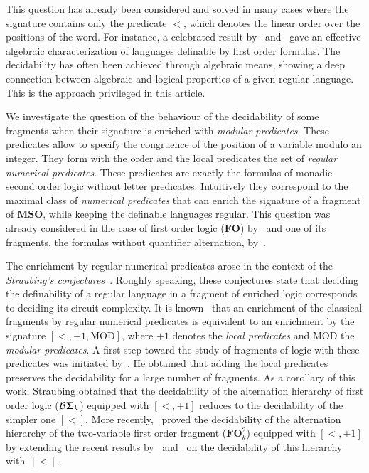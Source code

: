 \documentclass[submission,hidelink]{dmtcs-episciences}
\newcommand{\FO}{\mathbf{FO}}
\newcommand{\MSO}{\mathbf{MSO}}
\newcommand{\BS}{\mathbf{{\cal B}\Sigma}}
\newcommand{\MOD}{\mathrm{MOD}}
\begin{document}
	This question has already been considered and solved in many cases where the signature
	contains only the predicate $<$, which denotes the linear order over the positions of the word. For instance,
	a celebrated result by~\cite{Schutzenberger65} and~\cite{MP71}
	gave an effective algebraic characterization of languages definable by first order formulas.
	The decidability has often been achieved through
	algebraic means, showing a deep connection between algebraic and logical properties of
	a given regular language.
	This is the approach privileged in this article.

	We investigate the question of the behaviour of the decidability of some fragments
	when their signature is enriched with \emph{modular predicates}.
	These predicates allow to specify the congruence of the position of a variable modulo an integer.
	They form with the order and the local predicates the set of \emph{regular numerical predicates}.
	These predicates are exactly the formulas of monadic second order logic
	without letter predicates. Intuitively they correspond to the maximal
	class of \emph{numerical predicates} that can enrich the signature of a fragment of $\MSO$, while keeping the definable languages regular.
	This question was already considered in the case of first order logic ($\FO$) by~\cite{Bar92} and one
	of its fragments, the formulas without quantifier alternation, by~\cite{Pel92}.

	The enrichment by regular numerical predicates arose in the context of the
	\emph{Straubing's conjectures}~\citep{Straubing94}. Roughly speaking, these conjectures state that
	deciding the definability  of a regular language in a fragment of enriched logic corresponds to
	 deciding its circuit complexity.
	It is known~\citep{Pel92,Straubing94} that
	an enrichment of the classical fragments by regular numerical predicates is equivalent to an enrichment by the signature
	${[<,+1,\MOD]}$, where $+1$ denotes the \emph{local predicates}
	and $\MOD$ the \emph{modular predicates}.
	A first step toward  the study of fragments of logic with
	these predicates was initiated by~\cite{Straubing85}.
	He obtained  that
	adding the local predicates preserves the decidability for a large number of fragments. As a corollary
	of this work, Straubing obtained that the decidability of the alternation
	hierarchy of first order logic ($\BS_k$) equipped with $[<,+1]$ reduces to the
	decidability of the simpler one $[<]$.
More recently,~\cite{KL13} proved the decidability of the
	alternation hierarchy of the two-variable first order
	fragment ($\FO^2_k$) equipped with $[<,+1]$ by extending the recent results by~\cite{KS12} and~\cite{KW12} on the
	decidability of this hierarchy with~$[<]$.
\end{document}
